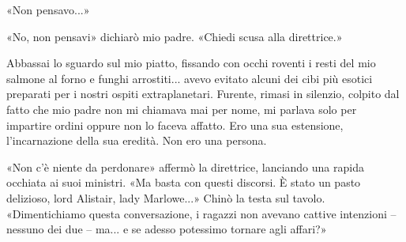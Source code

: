 «Non pensavo...»

«No, non pensavi» dichiarò mio padre. «Chiedi scusa alla direttrice.»

Abbassai lo sguardo sul mio piatto, fissando con occhi roventi i resti
del mio salmone al forno e funghi arrostiti... avevo evitato alcuni dei
cibi più esotici preparati per i nostri ospiti extraplanetari. Furente,
rimasi in silenzio, colpito dal fatto che mio padre non mi chiamava mai
per nome, mi parlava solo per impartire ordini oppure non lo faceva
affatto. Ero una sua estensione, l'incarnazione della sua eredità. Non
ero una persona.

«Non c'è niente da perdonare» affermò la direttrice, lanciando una
rapida occhiata ai suoi ministri. «Ma basta con questi discorsi. È stato
un pasto delizioso, lord Alistair, lady Marlowe...» Chinò la testa sul
tavolo. «Dimentichiamo questa conversazione, i ragazzi non avevano
cattive intenzioni -- nessuno dei due -- ma... e se adesso potessimo
tornare agli affari?»
